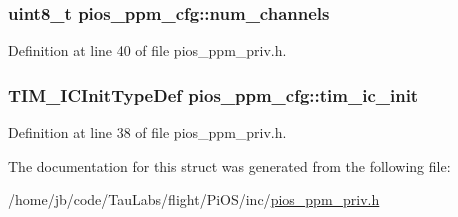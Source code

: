\hypertarget{structpios__ppm__cfg_a2b60f6cdabad556a4de0d2617cfe3309}{
\subsubsection[{num\-\_\-channels}]{\setlength{\rightskip}{0pt plus 5cm}uint8\-\_\-t {\bf pios\-\_\-ppm\-\_\-cfg\-::num\-\_\-channels}}}\label{structpios__ppm__cfg_a2b60f6cdabad556a4de0d2617cfe3309}


\-Definition at line 40 of file pios\-\_\-ppm\-\_\-priv.\-h.

\hypertarget{structpios__ppm__cfg_acecc33ca315a3edeb437b6073c1ec1b5}{
\subsubsection[{tim\-\_\-ic\-\_\-init}]{\setlength{\rightskip}{0pt plus 5cm}\-T\-I\-M\-\_\-\-I\-C\-Init\-Type\-Def {\bf pios\-\_\-ppm\-\_\-cfg\-::tim\-\_\-ic\-\_\-init}}}\label{structpios__ppm__cfg_acecc33ca315a3edeb437b6073c1ec1b5}


\-Definition at line 38 of file pios\-\_\-ppm\-\_\-priv.\-h.



\-The documentation for this struct was generated from the following file\-:\begin{DoxyCompactItemize}
\item 
/home/jb/code/\-Tau\-Labs/flight/\-Pi\-O\-S/inc/\hyperlink{pios__ppm__priv_8h}{pios\-\_\-ppm\-\_\-priv.\-h}\end{DoxyCompactItemize}
